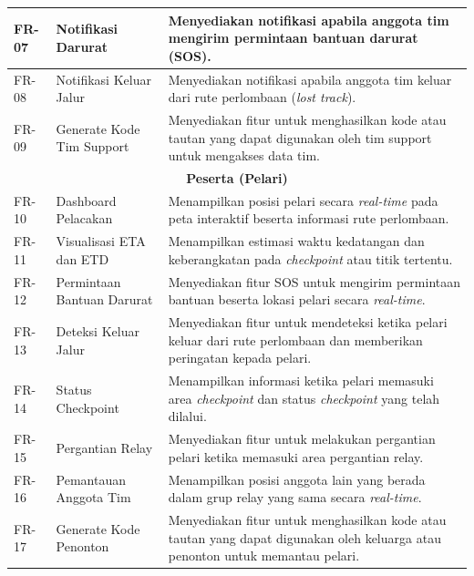 \begin{longtable}{|p{1.8cm}|p{4cm}|p{7cm}|}
FR-07 & Notifikasi Darurat &
Menyediakan notifikasi apabila anggota tim mengirim permintaan bantuan darurat (SOS). \\ \hline

FR-08 & Notifikasi Keluar Jalur &
Menyediakan notifikasi apabila anggota tim keluar dari rute perlombaan (\textit{lost track}). \\ \hline

FR-09 & Generate Kode Tim Support &
Menyediakan fitur untuk menghasilkan kode atau tautan yang dapat digunakan oleh tim support untuk mengakses data tim. \\ \hline


\multicolumn{3}{|c|}{\textbf{Peserta (Pelari)}} \\ \hline

FR-10 & Dashboard Pelacakan &
Menampilkan posisi pelari secara \textit{real-time} pada peta interaktif beserta informasi rute perlombaan. \\ \hline

FR-11 & Visualisasi ETA dan ETD &
Menampilkan estimasi waktu kedatangan dan keberangkatan pada \textit{checkpoint} atau titik tertentu. \\ \hline

FR-12 & Permintaan Bantuan Darurat &
Menyediakan fitur SOS untuk mengirim permintaan bantuan beserta lokasi pelari secara \textit{real-time}. \\ \hline

FR-13 & Deteksi Keluar Jalur &
Menyediakan fitur untuk mendeteksi ketika pelari keluar dari rute perlombaan dan memberikan peringatan kepada pelari. \\ \hline

FR-14 & Status Checkpoint &
Menampilkan informasi ketika pelari memasuki area \textit{checkpoint} dan status \textit{checkpoint} yang telah dilalui. \\ \hline

FR-15 & Pergantian Relay &
Menyediakan fitur untuk melakukan pergantian pelari ketika memasuki area pergantian relay. \\ \hline

FR-16 & Pemantauan Anggota Tim &
Menampilkan posisi anggota lain yang berada dalam grup relay yang sama secara \textit{real-time}. \\ \hline

FR-17 & Generate Kode Penonton &
Menyediakan fitur untuk menghasilkan kode atau tautan yang dapat digunakan oleh keluarga atau penonton untuk memantau pelari. \\ \hline


\end{longtable}
